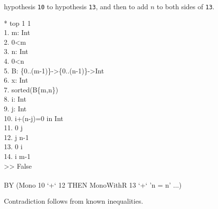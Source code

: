 hypothesis {\tt 10} to hypothesis {\tt 13}, and then to add $n$ to both sides
of {\tt 13}.
\begin{RuledFigure}
\begin{Screen}{1}{\SnapshotSize}
\N{}* top 1 1 \\{}
\N{}1. m: Int \\{}
\N{}2. 0<m \\{}
\N{}3. n: Int \\{}
\N{}4. 0<n \\{}
\N{}5. B: \{0..(m-1)\}->\{0..(n-1)\}->Int \\{}
\N{}6. x: Int \\{}
\N{}7. sorted(B\{m,n\}) \\{}
\N{}8. i: Int \\{}
\N{}9. j: Int \\{}
\N{}10. i+(n-j)=0 in Int \\{}
\N{}11. 0 \mleq{} j \\{}
\N{}12. j \mleq{} n-1 \\{}
\N{}13. 0 \mleq{} i \\{}
\N{}14. i \mleq{} m-1 \\{}
\N{}>> False \\{}
\N{} \\{}
\N{}BY (Mono 10 `+` 12 THEN MonoWithR 13 `+` 'n = n' ...) 
\end{Screen}%
\caption{Contradiction follows from known inequalities.}
\label{BaseCaseContr} 
\end{RuledFigure}

